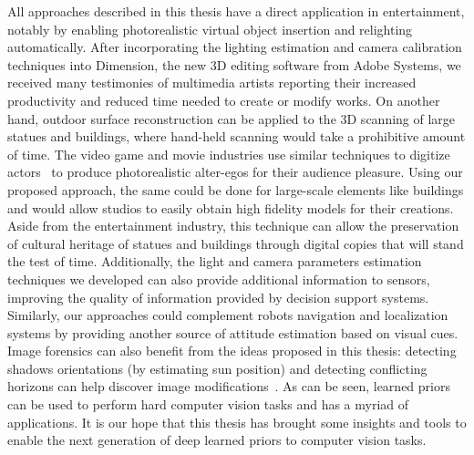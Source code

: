 All approaches described in this thesis have a direct application in entertainment, notably by enabling photorealistic virtual object insertion and relighting automatically. After incorporating the lighting estimation and camera calibration techniques into Dimension, the new 3D editing software from Adobe Systems, we received many testimonies of multimedia artists reporting their increased productivity and reduced time needed to create or modify works. On another hand, outdoor surface reconstruction can be applied to the 3D scanning of large statues and buildings, where hand-held scanning would take a prohibitive amount of time. The video game and movie industries use similar techniques to digitize actors~\cite{debevec2000acquiring} to produce photorealistic alter-egos for their audience pleasure. Using our proposed approach, the same could be done for large-scale elements like buildings and would allow studios to easily obtain high fidelity models for their creations. Aside from the entertainment industry, this technique can allow the preservation of cultural heritage of statues and buildings through digital copies that will stand the test of time. Additionally, the light and camera parameters estimation techniques we developed can also provide additional information to sensors, improving the quality of information provided by decision support systems. Similarly, our approaches could complement robots navigation and localization systems by providing another source of attitude estimation based on visual cues. Image forensics can also benefit from the ideas proposed in this thesis: detecting shadows orientations (by estimating sun position) and detecting conflicting horizons can help discover image modifications~\cite{Farid2010}. As can be seen, learned priors can be used to perform hard computer vision tasks and has a myriad of applications. It is our hope that this thesis has brought some insights and tools to enable the next generation of deep learned priors to computer vision tasks. 
